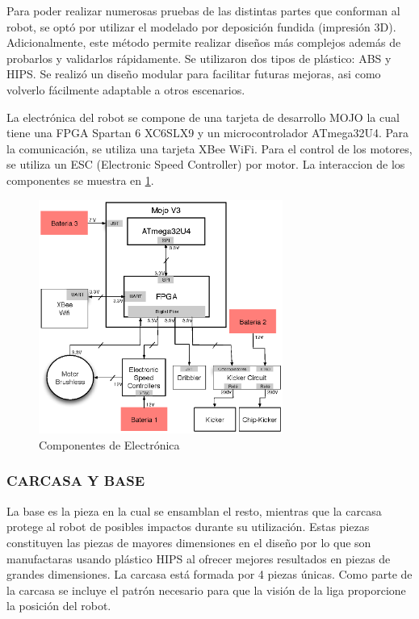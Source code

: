 \documentclass[twocolumn,10pt]{amrob}
\begin{document}
Para poder realizar numerosas pruebas de las distintas partes que conforman al robot, se optó por utilizar el modelado por deposición fundida (impresión 3D). Adicionalmente, este método permite realizar diseños más complejos además de probarlos y validarlos rápidamente. Se utilizaron dos tipos de plástico: ABS y HIPS. Se realizó un diseño modular para facilitar futuras mejoras, asi como volverlo fácilmente adaptable a otros escenarios.\par

La electrónica del robot se compone de una tarjeta de desarrollo MOJO la cual tiene una FPGA Spartan 6 XC6SLX9 y un microcontrolador ATmega32U4. Para la comunicaci\'on, se utiliza una tarjeta XBee WiFi. Para el control de los motores, se utiliza un ESC (Electronic Speed Controller) por motor. La interaccion de los componentes se muestra en \ref{fig:electGral}. \par
\begin{figure}
  \centering
    \includegraphics[width=8cm]{diagElectronica.eps}
  \caption{Componentes de Electrónica}
  \label{fig:electGral}
\end{figure}
\subsubsection*{CARCASA Y BASE}
La base es la pieza en la cual se ensamblan el resto, mientras que la carcasa protege al robot de posibles impactos durante su utilización. Estas piezas constituyen las piezas de mayores dimensiones en el dise\~no por lo que son manufactaras usando plástico HIPS al ofrecer mejores resultados en piezas de grandes dimensiones. La carcasa est\'a formada por 4 piezas \'unicas. Como parte de la carcasa se incluye el patrón necesario para que la visi\'on de la liga proporcione la posici\'on del robot.\par
\end{document}
